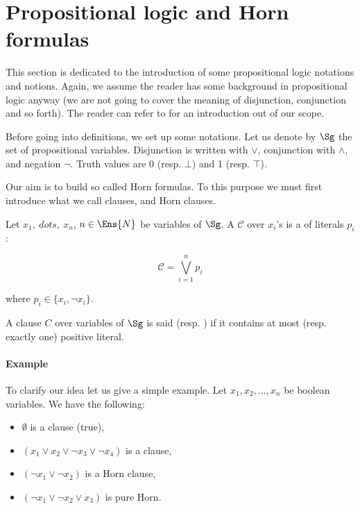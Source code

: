 \section{Propositional logic and Horn formulas}

This section is dedicated to the introduction of some propositional logic 
notations and notions. Again, we assume the reader has some background in
propositional logic anyway (we are not going to cover the meaning of 
disjunction, conjunction and so forth). The reader can refer to 
\cite{cori_mathematical_2000} for an introduction out of our scope.

\vspace{1.2em}

Before going into definitions, we set up some notations. Let us denote by
$\Sg$ the set of propositional variables. Disjunction is written with $\lor$,
conjunction with $\land$, and negation $\lnot$. Truth values are 0 (resp. 
$\bot$) and 1 (resp. $\top$). 

Our aim is to build so called Horn formulas. To this purpose we must first 
introduce what we call clauses, and Horn clauses. 


\begin{definition} Let $x_1, \ dots, \ x_n$, $n \in \Ens{N}$
be variables of $\Sg$. A  $\mathcal{C}$ over $x_i$'s is a 
 of literals $p_i$:

	\[ \mathcal{C} = \bigvee_{i = 1}^{n} p_i \]

\noindent where $p_i \in \{x_i, \lnot x_i \}$.
\end{definition}

\begin{definition} A clause $C$ over variables of 
$\Sg$
is said  (resp. ) if it contains at most (resp. 
exactly one) positive literal.

\end{definition}

\paragraph{Example} To clarify our idea let us give a simple example. Let $x_1,
x_2, \dots, x_n$ be boolean variables. We have the following:
\begin{itemize}
	\item $\emptyset$ is a clause (true),
	\item $(x_1 \lor x_2 \lor \lnot x_3 \lor \lnot x_4)$ is a clause,
	\item $(\lnot x_1 \lor \lnot x_2)$ is a Horn clause,
	\item $(\lnot x_1 \lor \lnot x_2 \lor x_3)$ is pure Horn.
\end{itemize}



